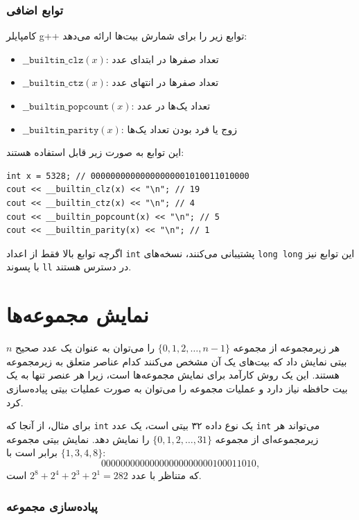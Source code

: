 \subsubsection*{توابع اضافی}

کامپایلر g++ توابع زیر را برای شمارش بیت‌ها ارائه می‌دهد:

\begin{itemize}
\item
$\texttt{\_\_builtin\_clz}(x)$:
تعداد صفرها در ابتدای عدد
\item
$\texttt{\_\_builtin\_ctz}(x)$:
تعداد صفرها در انتهای عدد
\item
$\texttt{\_\_builtin\_popcount}(x)$:
تعداد یک‌ها در عدد
\item
$\texttt{\_\_builtin\_parity}(x)$:
زوج یا فرد بودن تعداد یک‌ها
\end{itemize}
\begin{samepage}

این توابع به صورت زیر قابل استفاده هستند:
\begin{lstlisting}
int x = 5328; // 00000000000000000001010011010000
cout << __builtin_clz(x) << "\n"; // 19
cout << __builtin_ctz(x) << "\n"; // 4
cout << __builtin_popcount(x) << "\n"; // 5
cout << __builtin_parity(x) << "\n"; // 1
\end{lstlisting}
\end{samepage}

اگرچه توابع بالا فقط از اعداد \texttt{int} پشتیبانی می‌کنند،
نسخه‌های \texttt{long long} این توابع نیز با پسوند \texttt{ll} در دسترس هستند.

\section{نمایش مجموعه‌ها}

هر زیرمجموعه از مجموعه $\{0,1,2,\ldots,n-1\}$ را می‌توان به عنوان یک عدد صحیح $n$ بیتی نمایش داد که بیت‌های یک آن مشخص می‌کنند کدام عناصر متعلق به زیرمجموعه هستند.
این یک روش کارآمد برای نمایش مجموعه‌ها است، زیرا هر عنصر تنها به یک بیت حافظه نیاز دارد و عملیات مجموعه را می‌توان به صورت عملیات بیتی پیاده‌سازی کرد.

برای مثال، از آنجا که \texttt{int} یک نوع داده ۳۲ بیتی است، یک عدد \texttt{int} می‌تواند هر زیرمجموعه‌ای از مجموعه $\{0,1,2,\ldots,31\}$ را نمایش دهد.
نمایش بیتی مجموعه $\{1,3,4,8\}$ برابر است با:
\[00000000000000000000000100011010,\]
که متناظر با عدد $2^8+2^4+2^3+2^1=282$ است.

\subsubsection{پیاده‌سازی مجموعه}

